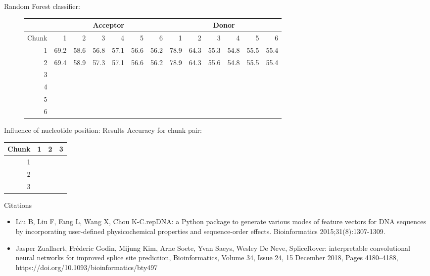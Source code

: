 \documentclass[10pt]{beamer}
\begin{document}
\begin{frame}
	Random Forest classifier:
	\begin{figure}
		\scriptsize
		\begingroup
		\centering
		\def\arraystretch{1.1}
		\begin{tabular}{|r|r|r|r|r|r|r|r|r|r|r|r|r|}
			\hline
			&\multicolumn{6}{c}{Acceptor}&\multicolumn{6}{|c|}{Donor}\\
			\hline
			Chunk&1&2&3&4&5&6&1&2&3&4&5&6\\
			\hline
			1&69.2&58.6&56.8&57.1&56.6&56.2&78.9&64.3&55.3&54.8&55.5&55.4\\
			2&69.4&58.9&57.3&57.1&56.6&56.2&78.9&64.3&55.6&54.8&55.5&55.4\\
			3&&&&&&&&&&&&\\
			4&&&&&&&&&&&&\\
			5&&&&&&&&&&&&\\
			6&&&&&&&&&&&&\\
			
			\hline 
		\end{tabular}
		\endgroup	
	\end{figure}
\end{frame}

\begin{frame}{Influence of nucleotide position: Results}
	Accuracy for chunk pair:\\
	\vspace{0.3cm}
	\begingroup
	\centering
	\def\arraystretch{1.1}
	\begin{tabular}{|r|r|r|r|}
		\hline
		Chunk&1&2&3\\
		\hline
		1&&&\\
		2&&&\\
		3&&&\\		
		\hline 
	\end{tabular}
	\endgroup
\end{frame}

\begin{frame}{Citations}
	\footnotesize
	\begin{itemize}
		\item Liu B, Liu F, Fang L, Wang X, Chou K-C.repDNA: a Python package to generate various modes of feature vectors for DNA sequences by incorporating user-defined physicochemical properties and sequence-order effects. Bioinformatics 2015;31(8):1307-1309.
		\item Jasper Zuallaert, Fréderic Godin, Mijung Kim, Arne Soete, Yvan Saeys, Wesley De Neve, SpliceRover: interpretable convolutional neural networks for improved splice site prediction, Bioinformatics, Volume 34, Issue 24, 15 December 2018, Pages 4180–4188, https://doi.org/10.1093/bioinformatics/bty497
	\end{itemize}
\end{frame}
\end{document}
